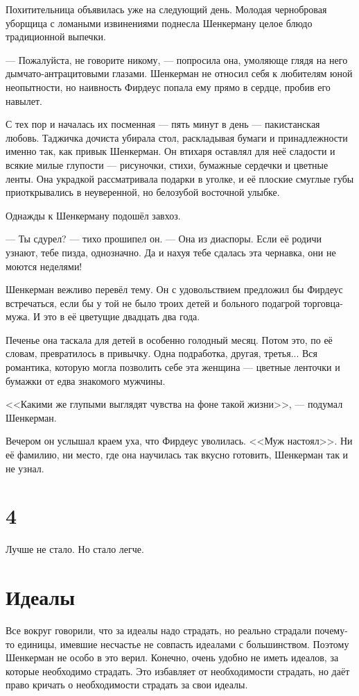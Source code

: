\documentclass[a4paper,10pt,fleqn]{book}\usepackage{polyglossia}\setdefaultlanguage{english}\setotherlanguage{russian}\defaultfontfeatures{Ligatures=TeX,Mapping=tex-text} \usepackage{xcolor}\definecolor{lightgray}{HTML}{bbbbbb}\color{lightgray}\newcommand{\ml}[3]{\textcolor{black}{#3}}
\begin{document}
Похитительница объявилась уже на следующий день.
Молодая чернобровая уборщица с ломаными извинениями поднесла Шенкерману целое блюдо традиционной выпечки.

--- Пожалуйста, не говорите никому, --- попросила она, умоляюще глядя на него дымчато-антрацитовыми глазами.
Шенкерман не относил себя к любителям юной неопытности, но наивность Фирдеус попала ему прямо в сердце, пробив его навылет.

С тех пор и началась их посменная --- пять минут в день --- пакистанская любовь.
Таджичка дочиста убирала стол, раскладывая бумаги и принадлежности именно так, как привык Шенкерман.
Он втихаря оставлял для неё сладости и всякие милые глупости --- рисуночки, стихи, бумажные сердечки и цветные ленты.
Она украдкой рассматривала подарки в уголке, и её плоские смуглые губы приоткрывались в неуверенной, но белозубой восточной улыбке.

Однажды к Шенкерману подошёл завхоз.

--- Ты сдурел? --- тихо прошипел он.
--- Она из диаспоры.
Если её родичи узнают, тебе пизда, однозначно.
Да и нахуя тебе сдалась эта чернавка, они не моются неделями!

Шенкерман вежливо перевёл тему.
Он с удовольствием предложил бы Фирдеус встречаться, если бы у той не было троих детей и больного подагрой торговца-мужа.
И это в её цветущие двадцать два года.

Печенье она таскала для детей в особенно голодный месяц.
Потом это, по её словам, превратилось в привычку.
Одна подработка, другая, третья...
Вся романтика, которую могла позволить себе эта женщина --- цветные ленточки и бумажки от едва знакомого мужчины.

<<Какими же глупыми выглядят чувства на фоне такой жизни>>, --- подумал Шенкерман.

Вечером он услышал краем уха, что Фирдеус уволилась.
<<Муж настоял>>.
Ни её фамилию, ни место, где она научилась так вкусно готовить, Шенкерман так и не узнал.

\section{4}

Лучше не стало.
Но стало легче.

\section{Идеалы}

Все вокруг говорили, что за идеалы надо страдать, но реально страдали почему-то единицы, имевшие несчастье не совпасть идеалами с большинством.
Поэтому Шенкерман не особо в это верил.
Конечно, очень удобно не иметь идеалов, за которые необходимо страдать.
Это избавляет от необходимости страдать, но даёт право кричать о необходимости страдать за свои идеалы.
\end{document}
